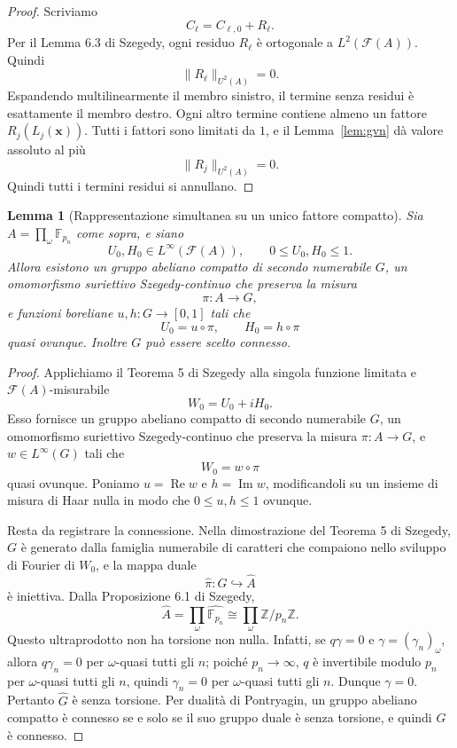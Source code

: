 \documentclass[11pt]{article}
\numberwithin{equation}{section}
\newtheorem{lemma}[theorem]{Lemma}
\newcommand{\F}{\mathbb F}
\newcommand{\Z}{\mathbb Z}
\newcommand{\1}{\mathbf 1}
\newcommand{\calF}{\mathcal F}
\begin{document}
\begin{proof}
Scriviamo
\[
        C_\ell=C_{\ell,0}+R_\ell.
\]
Per il Lemma 6.3 di Szegedy, ogni residuo \(R_\ell\) è ortogonale a \(L^2(\calF(A))\). Quindi
\[
        \|R_\ell\|_{U^2(A)}=0.
\]
Espandendo multilinearmente il membro sinistro, il termine senza residui è esattamente il membro destro. Ogni altro termine contiene almeno un fattore \(R_j(L_j(\mathbf x))\). Tutti i fattori sono limitati da \(1\), e il Lemma~\ref{lem:gvn} dà valore assoluto al più
\[
        \|R_j\|_{U^2(A)}=0.
\]
Quindi tutti i termini residui si annullano.
\end{proof}

\begin{lemma}[Rappresentazione simultanea su un unico fattore compatto]
\label{lem:simultaneous-factor}
Sia \(A=\prod_\omega\F_{p_n}\) come sopra, e siano
\[
        U_0,H_0\in L^\infty(\calF(A)),
        \qquad 0\le U_0,H_0\le1.
\]
Allora esistono un gruppo abeliano compatto di secondo numerabile \(G\), un omomorfismo suriettivo Szegedy-continuo che preserva la misura
\[
        \pi:A\to G,
\]
e funzioni boreliane \(u,h:G\to[0,1]\) tali che
\[
        U_0=u\circ\pi,
        \qquad
        H_0=h\circ\pi
\]
quasi ovunque. Inoltre \(G\) può essere scelto connesso.
\end{lemma}

\begin{proof}
Applichiamo il Teorema 5 di Szegedy alla singola funzione limitata e \(\calF(A)\)-misurabile
\[
        W_0=U_0+iH_0.
\]
Esso fornisce un gruppo abeliano compatto di secondo numerabile \(G\), un omomorfismo suriettivo Szegedy-continuo che preserva la misura \(\pi:A\to G\), e \(w\in L^\infty(G)\) tali che
\[
        W_0=w\circ\pi
\]
quasi ovunque. Poniamo \(u=\operatorname{Re}w\) e \(h=\operatorname{Im}w\), modificandoli su un insieme di misura di Haar nulla in modo che \(0\le u,h\le1\) ovunque.

Resta da registrare la connessione. Nella dimostrazione del Teorema 5 di Szegedy, \(G\) è generato dalla famiglia numerabile di caratteri che compaiono nello sviluppo di Fourier di \(W_0\), e la mappa duale
\[
        \widehat\pi:\widehat G\hookrightarrow\widehat A
\]
è iniettiva. Dalla Proposizione 6.1 di Szegedy,
\[
        \widehat A=\prod_\omega\widehat{\F_{p_n}}
        \cong\prod_\omega\Z/p_n\Z.
\]
Questo ultraprodotto non ha torsione non nulla. Infatti, se \(q\gamma=0\) e \(\gamma=(\gamma_n)_\omega\), allora \(q\gamma_n=0\) per \(\omega\)-quasi tutti gli \(n\); poiché \(p_n\to\infty\), \(q\) è invertibile modulo \(p_n\) per \(\omega\)-quasi tutti gli \(n\), quindi \(\gamma_n=0\) per \(\omega\)-quasi tutti gli \(n\). Dunque \(\gamma=0\). Pertanto \(\widehat G\) è senza torsione. Per dualità di Pontryagin, un gruppo abeliano compatto è connesso se e solo se il suo gruppo duale è senza torsione, e quindi \(G\) è connesso.
\end{proof}
\end{document}

